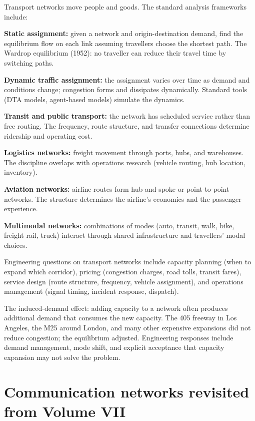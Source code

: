 Transport networks move people and goods. The standard analysis frameworks include:

\textbf{Static assignment:} given a network and origin-destination demand, find the equilibrium flow on each link assuming travellers choose the shortest path. The Wardrop equilibrium (1952): no traveller can reduce their travel time by switching paths.

\textbf{Dynamic traffic assignment:} the assignment varies over time as demand and conditions change; congestion forms and dissipates dynamically. Standard tools (DTA models, agent-based models) simulate the dynamics.

\textbf{Transit and public transport:} the network has scheduled service rather than free routing. The frequency, route structure, and transfer connections determine ridership and operating cost.

\textbf{Logistics networks:} freight movement through ports, hubs, and warehouses. The discipline overlaps with operations research (vehicle routing, hub location, inventory).

\textbf{Aviation networks:} airline routes form hub-and-spoke or point-to-point networks. The structure determines the airline's economics and the passenger experience.

\textbf{Multimodal networks:} combinations of modes (auto, transit, walk, bike, freight rail, truck) interact through shared infrastructure and travellers' modal choices.

Engineering questions on transport networks include capacity planning (when to expand which corridor), pricing (congestion charges, road tolls, transit fares), service design (route structure, frequency, vehicle assignment), and operations management (signal timing, incident response, dispatch).

The induced-demand effect: adding capacity to a network often produces additional demand that consumes the new capacity. The 405 freeway in Los Angeles, the M25 around London, and many other expensive expansions did not reduce congestion; the equilibrium adjusted. Engineering responses include demand management, mode shift, and explicit acceptance that capacity expansion may not solve the problem.

\section{Communication networks revisited from Volume VII}

